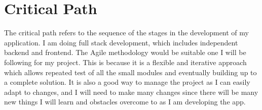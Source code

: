         
\section{Critical Path}
The critical path refers to the sequence of the stages in the development of my application. I am doing full stack development, which includes independent backend and frontend. The Agile methodology would be suitable one I will be following for my project. This is because it is a flexible and iterative approach which allows repeated test of all the small modules and eventually building up to a complete solution. It is also a good way to manage the project as I can easily adapt to changes, and I will need to make many changes since there will be many new things I will learn and obstacles overcome to as I am developing the app.

